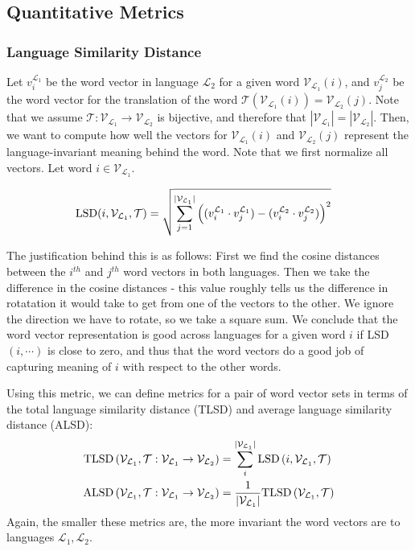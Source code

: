 \documentclass[12pt, usenames]{article}
\theoremstyle{definition}
\theoremstyle{definition}
\theoremstyle{definition}
\newcommand{\txt}[1]
{\textnormal{#1}}
\newcommand{\mc}[1]
{\mathcal{#1}}
\begin{document}
\subsection{Quantitative Metrics}

\subsubsection{Language Similarity Distance}

Let $v_i^{\mc{L}_1}$ be the word vector in language $\mc{L}_2$ for a given word $\mc{V}_{\mc{L}_1}(i)$, and $v_j^{\mc{L}_2}$ be the word vector for the translation of the word $\mc{T}\left(\mc{V}_{\mc{L}_1}(i)\right) = \mc{V}_{\mc{L}_2}(j)$. Note that we assume $\mc{T}:\mc{V}_{\mc{L}_1} \to \mc{V}_{\mc{L}_2}$ is bijective, and therefore that $|\mc{V}_{\mc{L}_1}| =  |\mc{V}_{\mc{L}_2}|$. Then, we want to compute how well the vectors for $\mc{V}_{\mc{L}_1}(i)$ and $\mc{V}_{\mc{L}_2}(j)$ represent the language-invariant meaning behind the word. Note that we first normalize all vectors. Let word $i \in \mc{V}_{\mc{L}_1}$. 

\begin{align}
\label{eq:LSD}
\txt{LSD}(i, \mc{V}_{\mc{L}_1}, \mc{T}) &= \sqrt{\sum_{j = 1}^{|\mc{V}_{\mc{L}_1}|} \left((v_i^{\mc{L}_1} \cdot v_j^{\mc{L}_1}) - (v_i^{\mc{L}_2} \cdot v_j^{\mc{L}_2})\right)^2}
\end{align}

The justification behind this is as follows: First we find the cosine distances between the $i^{th}$ and $j^{th}$ word vectors in both languages. Then we take the difference in the cosine distances - this value roughly tells us the difference in rotatation it would take to get from one of the vectors to the other. We ignore the direction we have to rotate, so we take a square sum. We conclude that the word vector representation is good across languages for a given word $i$ if LSD$(i, \cdots)$ is close to zero, and thus that the word vectors do a good job of capturing meaning of $i$ with respect to the other words. 

Using this metric, we can define metrics for a pair of word vector sets in terms of the total language similarity distance (TLSD) and average language similarity distance (ALSD):
\begin{align}
\label{eq:LSD_sum}
\begin{split}
\txt{TLSD}\left(\mc{V}_{\mc{L}_1}, \mc{T}:\mc{V}_{\mc{L}_1} \to \mc{V}_{\mc{L}_2}\right) &= \sum_i^{|\mc{V}_{\mc{L}_1}|} \txt{LSD}\left(i, \mc{V}_{\mc{L}_1}, \mc{T}\right)
\\
\txt{ALSD}\left(\mc{V}_{\mc{L}_1}, \mc{T}:\mc{V}_{\mc{L}_1} \to \mc{V}_{\mc{L}_2}\right) &= \frac{1}{|\mc{V}_{\mc{L}_1}|}\txt{TLSD}\left(\mc{V}_{\mc{L}_1}, \mc{T}\right)
\end{split}
\end{align}
Again, the smaller these metrics are, the more invariant the word vectors are to languages $\mc{L}_1, \mc{L}_2$. 
\end{document}
